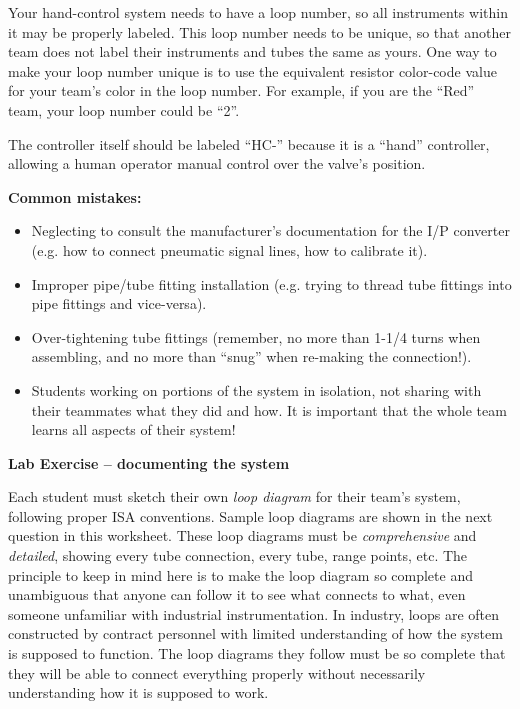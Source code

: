 Your hand-control system needs to have a loop number, so all instruments within it may be properly labeled.  This loop number needs to be unique, so that another team does not label their instruments and tubes the same as yours.  One way to make your loop number unique is to use the equivalent resistor color-code value for your team's color in the loop number.  For example, if you are the ``Red'' team, your loop number could be ``2''. 

The controller itself should be labeled ``HC-'' because it is a ``hand'' controller, allowing a human operator manual control over the valve's position.

\vskip 10pt

{\bf Common mistakes:}

\begin{itemize}
\item Neglecting to consult the manufacturer's documentation for the I/P converter (e.g. how to connect pneumatic signal lines, how to calibrate it).
\item Improper pipe/tube fitting installation (e.g. trying to thread tube fittings into pipe fittings and vice-versa).
\item Over-tightening tube fittings (remember, no more than 1-1/4 turns when assembling, and no more than ``snug'' when re-making the connection!).
\item Students working on portions of the system in isolation, not sharing with their teammates what they did and how.  It is important that the whole team learns all aspects of their system!
\end{itemize}


\vfil \eject

\noindent
{\bf Lab Exercise -- documenting the system}

\vskip 5pt

Each student must sketch their own {\it loop diagram} for their team's system, following proper ISA conventions.  Sample loop diagrams are shown in the next question in this worksheet.  These loop diagrams must be {\it comprehensive} and {\it detailed}, showing every tube connection, every tube, range points, etc.  The principle to keep in mind here is to make the loop diagram so complete and unambiguous that anyone can follow it to see what connects to what, even someone unfamiliar with industrial instrumentation.  In industry, loops are often constructed by contract personnel with limited understanding of how the system is supposed to function.  The loop diagrams they follow must be so complete that they will be able to connect everything properly without necessarily understanding how it is supposed to work.

